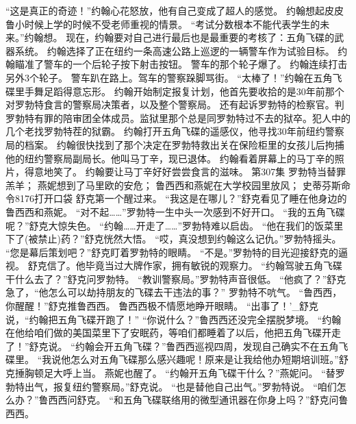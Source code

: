 \documentclass[a4paper,12pt,UTF8,twoside]{ctexbook}
\begin{document}
        “这是真正的奇迹！”约翰心花怒放，他有自己变成了超人的感觉。  
        约翰想起皮皮鲁小时候上学的时候不受老师重视的情景。  
        “考试分数根本不能代表学生的未来。”约翰想。  
        现在，约翰要对自己进行最后也是最重要的考核了：五角飞碟的武器系统。  
        约翰选择了正在纽约一条高速公路上巡逻的一辆警车作为试验目标。  
        约翰瞄准了警车的一个后轮子按下射击按钮。  
        警车的那个轮子爆了。  
        约翰连续打击另外3个轮子。  
        警车趴在路上。驾车的警察跺脚骂街。  
        “太棒了！”约翰在五角飞碟里手舞足蹈得意忘形。  
        约翰开始制定报复计划，他首先要收拾的是30年前那个对罗勃特食言的警察局决策者，以及整个警察局。  
        还有起诉罗勃特的检察官。判罗勃特有罪的陪审团全体成员。监狱里那个总是同罗勃特过不去的狱卒。犯人中的几个老找罗勃特茬的狱霸。  
        约翰打开五角飞碟的遥感仪，他寻找30年前纽约警察局的档案。  
        约翰很快找到了那个决定在罗勃特救出关在保险柜里的女孩儿后拘捕他的纽约警察局副局长。他叫马丁辛，现已退体。  
        约翰看着屏幕上的马丁辛的照片，得意地笑了。  
        约翰要让马丁辛好好尝尝食言的滋味。          第307集  
        罗勃特当替罪羔羊；  
        燕妮想到了马里欧的安危；  
        鲁西西和燕妮在大学校园里放风；  
        史蒂芬斯命令8176打开口袋    
        舒克第一个醒过来。  
        “我这是在哪儿？”舒克看见了睡在他身边的鲁西西和燕妮。  
        “对不起……”罗勃特一生中头一次感到不好开口。  
        “我的五角飞碟呢？”舒克大惊失色。  
        “约翰……开走了……”罗勃特难以启齿。  
        “他在我们的饭菜里下了(被禁止)药？”舒克恍然大悟。  
        “哎，真没想到约翰这么记仇。”罗勃特摇头。  
        “您是幕后策划吧？”舒克盯着罗勃特的眼睛。        
        “不是。”罗勃特的目光迎接舒克的逼视。  
        舒克信了。他毕竟当过大牌作家，拥有敏锐的观察力。  
        “约翰驾驶五角飞碟干什么去了？”舒克问罗勃特。  
        “教训警察局。”罗勃特声音很低。  
        “他疯了？”舒克急了，“他怎么可以劫持朋友的飞碟去干违法的事？”  
        罗勃特不吭气。  
        “鲁西西，你醒醒！”舒克推鲁西西。  
        鲁西西极不情愿地睁开眼睛。  
        “出事了！'_舒克说，“约翰把五角飞碟开跑了！”  
        “你说什么？”鲁西西还没完全摆脱梦境。  
        “约翰在他给咱们做的美国菜里下了安眠药，等咱们都睡着了以后，他把五角飞碟开走了！”舒克说。  
        “约翰会开五角飞碟？”鲁西西巡视四周，发现自己确实不在五角飞碟里。  
        “我说他怎么对五角飞碟那么感兴趣呢！原来是让我给他办短期培训班。”舒克捶胸顿足大呼上当。  
        燕妮也醒了。  
        “约翰开五角飞碟干什么？”燕妮问。  
        “替罗勃特出气，报复纽约警察局。”舒克说。        
        “也是替他自己出气。”罗勃特说。  
        “咱们怎么办？”鲁西西问舒克。  
        “和五角飞碟联络用的微型通讯器在你身上吗？”舒克问鲁西西。  
\end{document}
